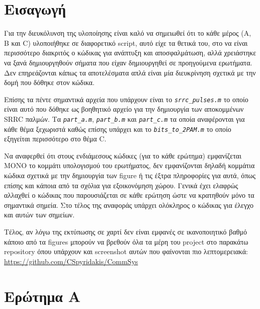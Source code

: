 \documentclass[11pt]{article}
\begin{document}
    \section{Εισαγωγή}
    Για την διευκόλυνση της υλοποίησης είναι καλό να σημειωθεί ότι το κάθε μέρος (Α, Β και C) υλοποιήθηκε σε διαφορετικό script, αυτό είχε τα θετικά του, στο να είναι περισσότερο διακριτός ο κώδικας για ανάπτυξη και αποσφαλμάτωση, αλλά χρειάστηκε να ξανά δημιουργηθούν σήματα που είχαν δημιουργηθεί σε προηγούμενα ερωτήματα. Δεν επηρεάζονται κάπως τα αποτελέσματα απλά είναι μία διευκρίνηση σχετικά με την δομή που δόθηκε στον κώδικα. 
    \par \noindent
    Επίσης τα πέντε σημαντικά αρχεία που υπάρχουν είναι το \emph{\texttt{srrc\_pulses.m}} το οποίο είναι αυτό που δόθηκε ως βοηθητικό αρχείο για την δημιουργία των αποκομμένων SRRC παλμών. Τα \emph{\texttt{part\_a.m}}, \emph{\texttt{part\_b.m}} και \emph{\texttt{part\_c.m}} τα οποία αναφέρονται για κάθε θέμα ξεχωριστά καθώς επίσης υπάρχει και το \emph{\texttt{bits\_to\_2PAM.m}} το οποίο εξηγείται περισσότερο στο θέμα C.
    \par \noindent
    Να αναφερθεί ότι στους ενδιάμεσους κώδικες (για το κάθε ερώτημα) εμφανίζεται ΜΟΝΟ το κομμάτι υπολογισμού του ερωτήματος, δεν εμφανίζονται δηλαδή κομμάτια κώδικα σχετικά με την δημιουργία των figure ή τις έξτρα πληροφορίες για αυτά, όπως επίσης και κάποια από τα σχόλια για εξοικονόμηση χώρου. Γενικά έχει ελαφρώς αλλαχθεί ο κώδικας που παρουσιάζεται σε κάθε ερώτηση ώστε να κρατηθούν μόνο τα σημαντικά σημεία. Στο τέλος της αναφοράς υπάρχει ολόκληρος ο κώδικας για έλεγχο και αυτών των σημείων.
    \par \noindent
    Τέλος, αν λόγω της εκτύπωσης σε χαρτί δεν είναι εμφανές σε ικανοποιητικό βαθμό κάποιο από τα figures μπορούν να βρεθούν όλα τα μέρη του project στο παρακάτω repository όπου υπάρχουν και screenshot αυτών που φαίνονται πιο λεπτομερειακά: \url{https://github.com/CSpyridakis/CommSys}



    \section{Ερώτημα Α}
    
\end{document}
